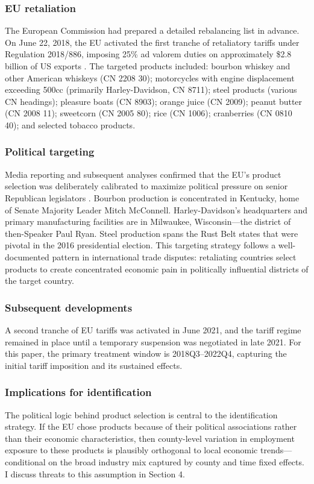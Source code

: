 \documentclass[12pt]{article}
\begin{document}
\subsubsection*{EU retaliation} The European Commission had prepared a detailed rebalancing list in advance. On June 22, 2018, the EU activated the first tranche of retaliatory tariffs under Regulation 2018/886, imposing 25\% ad valorem duties on approximately \$2.8 billion of US exports \citep{eu2018regulation}. The targeted products included: bourbon whiskey and other American whiskeys (CN 2208 30); motorcycles with engine displacement exceeding 500cc (primarily Harley-Davidson, CN 8711); steel products (various CN headings); pleasure boats (CN 8903); orange juice (CN 2009); peanut butter (CN 2008 11); sweetcorn (CN 2005 80); rice (CN 1006); cranberries (CN 0810 40); and selected tobacco products.

\subsubsection*{Political targeting} Media reporting and subsequent analyses confirmed that the EU's product selection was deliberately calibrated to maximize political pressure on senior Republican legislators \citep{lake2022economic}. Bourbon production is concentrated in Kentucky, home of Senate Majority Leader Mitch McConnell. Harley-Davidson's headquarters and primary manufacturing facilities are in Milwaukee, Wisconsin---the district of then-Speaker Paul Ryan. Steel production spans the Rust Belt states that were pivotal in the 2016 presidential election. This targeting strategy follows a well-documented pattern in international trade disputes: retaliating countries select products to create concentrated economic pain in politically influential districts of the target country.

\subsubsection*{Subsequent developments} A second tranche of EU tariffs was activated in June 2021, and the tariff regime remained in place until a temporary suspension was negotiated in late 2021. For this paper, the primary treatment window is 2018Q3--2022Q4, capturing the initial tariff imposition and its sustained effects.

\subsubsection*{Implications for identification} The political logic behind product selection is central to the identification strategy. If the EU chose products because of their political associations rather than their economic characteristics, then county-level variation in employment exposure to these products is plausibly orthogonal to local economic trends---conditional on the broad industry mix captured by county and time fixed effects. I discuss threats to this assumption in Section 4.
\end{document}
